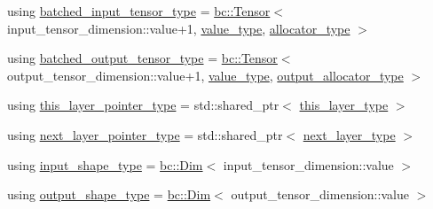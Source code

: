 \begin{DoxyCompactItemize}
\item 
using \hyperlink{structbc_1_1nn_1_1Polymorphic__Layer__Base_ae694b03dd73923ff973b0d2c9156e161}{batched\+\_\+input\+\_\+tensor\+\_\+type} = \hyperlink{namespacebc_a659391e47ab612be3ba6c18cf9c89159}{bc\+::\+Tensor}$<$ input\+\_\+tensor\+\_\+dimension\+::value+1, \hyperlink{structbc_1_1nn_1_1Polymorphic__Layer__Base_aa7d46845ee0a4544003a6f8fe3b7f52a}{value\+\_\+type}, \hyperlink{structbc_1_1nn_1_1Polymorphic__Layer__Base_a1414f8c37dea6254aebf63e4486ed818}{allocator\+\_\+type} $>$
\item 
using \hyperlink{structbc_1_1nn_1_1Polymorphic__Layer__Base_a45ed57549be9c4e5c40c52168ca15ae9}{batched\+\_\+output\+\_\+tensor\+\_\+type} = \hyperlink{namespacebc_a659391e47ab612be3ba6c18cf9c89159}{bc\+::\+Tensor}$<$ output\+\_\+tensor\+\_\+dimension\+::value+1, \hyperlink{structbc_1_1nn_1_1Polymorphic__Layer__Base_aa7d46845ee0a4544003a6f8fe3b7f52a}{value\+\_\+type}, \hyperlink{structbc_1_1nn_1_1Polymorphic__Layer__Base_a4bc904c1787b9da18e35d0c6b60ac59f}{output\+\_\+allocator\+\_\+type} $>$
\item 
using \hyperlink{structbc_1_1nn_1_1Polymorphic__Layer__Base_a6240b9012fcc8ed91d8a41f07d7c4bd9}{this\+\_\+layer\+\_\+pointer\+\_\+type} = std\+::shared\+\_\+ptr$<$ \hyperlink{structbc_1_1nn_1_1Polymorphic__Layer__Base_a6087076d2e0a31e6bbdc2c2039c3ab52}{this\+\_\+layer\+\_\+type} $>$
\item 
using \hyperlink{structbc_1_1nn_1_1Polymorphic__Layer__Base_a6f8d2b06bb46d0ef96d0857df2544731}{next\+\_\+layer\+\_\+pointer\+\_\+type} = std\+::shared\+\_\+ptr$<$ \hyperlink{structbc_1_1nn_1_1Polymorphic__Layer__Base_ac7d70db83e8370d2975d05401713f677}{next\+\_\+layer\+\_\+type} $>$
\item 
using \hyperlink{structbc_1_1nn_1_1Polymorphic__Layer__Base_ad69ba46ce14f9fbef88b834828052ab4}{input\+\_\+shape\+\_\+type} = \hyperlink{structbc_1_1Dim}{bc\+::\+Dim}$<$ input\+\_\+tensor\+\_\+dimension\+::value $>$
\item 
using \hyperlink{structbc_1_1nn_1_1Polymorphic__Layer__Base_a130df92a457150349fe554eeee4dd32a}{output\+\_\+shape\+\_\+type} = \hyperlink{structbc_1_1Dim}{bc\+::\+Dim}$<$ output\+\_\+tensor\+\_\+dimension\+::value $>$
\end{DoxyCompactItemize}
